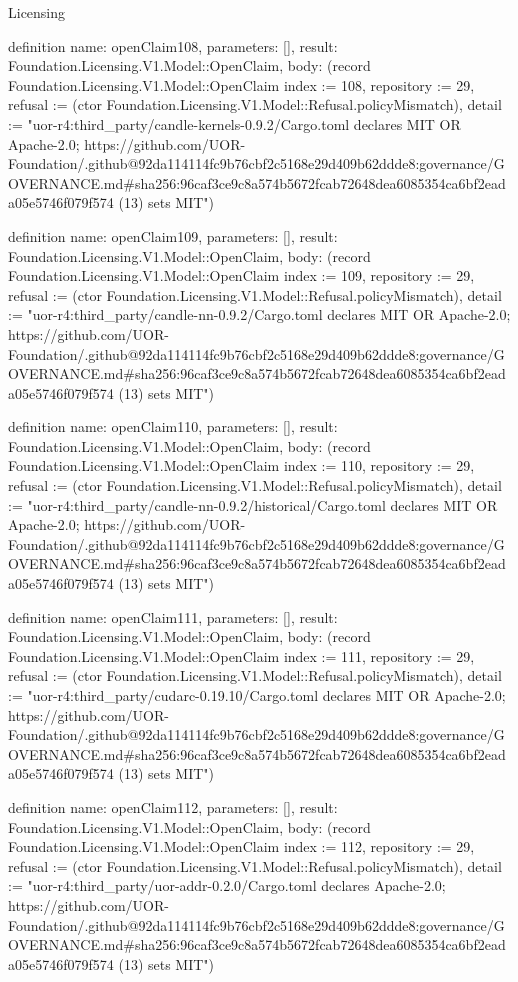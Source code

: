 \begin{lexlean}{Licensing}
\begin{semanticmodule}
definition{
  name: openClaim108,
  parameters: [],
  result: Foundation.Licensing.V1.Model::OpenClaim,
  body: (record Foundation.Licensing.V1.Model::OpenClaim {index := 108, repository := 29, refusal := (ctor Foundation.Licensing.V1.Model::Refusal.policyMismatch), detail := "uor-r4:third_party/candle-kernels-0.9.2/Cargo.toml declares MIT OR Apache-2.0; https://github.com/UOR-Foundation/.github@92da114114fc9b76cbf2c5168e29d409b62ddde8:governance/GOVERNANCE.md#sha256:96caf3ce9c8a574b5672fcab72648dea6085354ca6bf2eada05e5746f079f574 (13) sets MIT"})
}

definition{
  name: openClaim109,
  parameters: [],
  result: Foundation.Licensing.V1.Model::OpenClaim,
  body: (record Foundation.Licensing.V1.Model::OpenClaim {index := 109, repository := 29, refusal := (ctor Foundation.Licensing.V1.Model::Refusal.policyMismatch), detail := "uor-r4:third_party/candle-nn-0.9.2/Cargo.toml declares MIT OR Apache-2.0; https://github.com/UOR-Foundation/.github@92da114114fc9b76cbf2c5168e29d409b62ddde8:governance/GOVERNANCE.md#sha256:96caf3ce9c8a574b5672fcab72648dea6085354ca6bf2eada05e5746f079f574 (13) sets MIT"})
}

definition{
  name: openClaim110,
  parameters: [],
  result: Foundation.Licensing.V1.Model::OpenClaim,
  body: (record Foundation.Licensing.V1.Model::OpenClaim {index := 110, repository := 29, refusal := (ctor Foundation.Licensing.V1.Model::Refusal.policyMismatch), detail := "uor-r4:third_party/candle-nn-0.9.2/historical/Cargo.toml declares MIT OR Apache-2.0; https://github.com/UOR-Foundation/.github@92da114114fc9b76cbf2c5168e29d409b62ddde8:governance/GOVERNANCE.md#sha256:96caf3ce9c8a574b5672fcab72648dea6085354ca6bf2eada05e5746f079f574 (13) sets MIT"})
}

definition{
  name: openClaim111,
  parameters: [],
  result: Foundation.Licensing.V1.Model::OpenClaim,
  body: (record Foundation.Licensing.V1.Model::OpenClaim {index := 111, repository := 29, refusal := (ctor Foundation.Licensing.V1.Model::Refusal.policyMismatch), detail := "uor-r4:third_party/cudarc-0.19.10/Cargo.toml declares MIT OR Apache-2.0; https://github.com/UOR-Foundation/.github@92da114114fc9b76cbf2c5168e29d409b62ddde8:governance/GOVERNANCE.md#sha256:96caf3ce9c8a574b5672fcab72648dea6085354ca6bf2eada05e5746f079f574 (13) sets MIT"})
}

definition{
  name: openClaim112,
  parameters: [],
  result: Foundation.Licensing.V1.Model::OpenClaim,
  body: (record Foundation.Licensing.V1.Model::OpenClaim {index := 112, repository := 29, refusal := (ctor Foundation.Licensing.V1.Model::Refusal.policyMismatch), detail := "uor-r4:third_party/uor-addr-0.2.0/Cargo.toml declares Apache-2.0; https://github.com/UOR-Foundation/.github@92da114114fc9b76cbf2c5168e29d409b62ddde8:governance/GOVERNANCE.md#sha256:96caf3ce9c8a574b5672fcab72648dea6085354ca6bf2eada05e5746f079f574 (13) sets MIT"})
}


\end{semanticmodule}
\end{lexlean}
